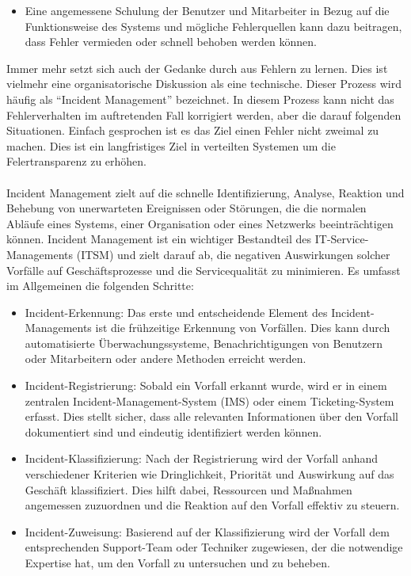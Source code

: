 \begin{itemize}
\begin{itemize}
\item Eine angemessene Schulung der Benutzer und Mitarbeiter in Bezug auf die Funktionsweise des Systems und mögliche Fehlerquellen kann dazu beitragen, dass Fehler vermieden oder schnell behoben werden können.
\end{itemize}
Immer mehr setzt sich auch der Gedanke durch aus Fehlern zu lernen. Dies ist vielmehr eine organisatorische Diskussion als eine technische. Dieser Prozess wird häufig als \enquote{Incident Management} bezeichnet. In diesem Prozess kann nicht das Fehlerverhalten im auftretenden Fall korrigiert werden, aber die darauf folgenden Situationen. Einfach gesprochen ist es das Ziel einen Fehler nicht zweimal zu machen. Dies ist ein langfristiges Ziel in verteilten Systemen um die Felertransparenz zu erhöhen. 
\\\\
Incident Management zielt auf die schnelle Identifizierung, Analyse, Reaktion und Behebung von unerwarteten Ereignissen oder Störungen, die die normalen Abläufe eines Systems, einer Organisation oder eines Netzwerks beeinträchtigen können. Incident Management ist ein wichtiger Bestandteil des IT-Service-Managements (ITSM) und zielt darauf ab, die negativen Auswirkungen solcher Vorfälle auf Geschäftsprozesse und die Servicequalität zu minimieren. Es umfasst im Allgemeinen die folgenden Schritte:
\begin{itemize}
\item Incident-Erkennung: Das erste und entscheidende Element des Incident-Managements ist die frühzeitige Erkennung von Vorfällen. Dies kann durch automatisierte Überwachungssysteme, Benachrichtigungen von Benutzern oder Mitarbeitern oder andere Methoden erreicht werden.
\item Incident-Registrierung: Sobald ein Vorfall erkannt wurde, wird er in einem zentralen Incident-Management-System (IMS) oder einem Ticketing-System erfasst. Dies stellt sicher, dass alle relevanten Informationen über den Vorfall dokumentiert sind und eindeutig identifiziert werden können.
\item Incident-Klassifizierung: Nach der Registrierung wird der Vorfall anhand verschiedener Kriterien wie Dringlichkeit, Priorität und Auswirkung auf das Geschäft klassifiziert. Dies hilft dabei, Ressourcen und Maßnahmen angemessen zuzuordnen und die Reaktion auf den Vorfall effektiv zu steuern.
\item Incident-Zuweisung: Basierend auf der Klassifizierung wird der Vorfall dem entsprechenden Support-Team oder Techniker zugewiesen, der die notwendige Expertise hat, um den Vorfall zu untersuchen und zu beheben.

\end{itemize}
\end{itemize}
